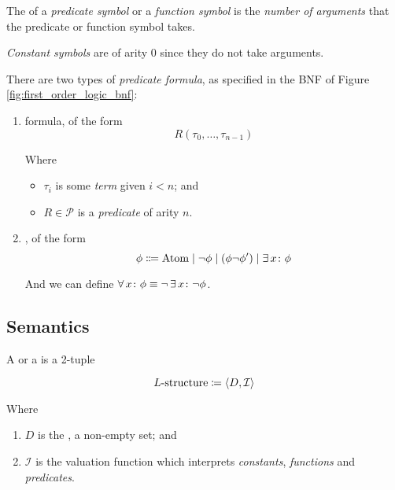 \begin{definition}[Arity]
    The  of a \textit{predicate symbol} or a \textit{function symbol} is the
    \textit{number of arguments} that the predicate or function symbol takes.
    
    \textit{Constant symbols} are of arity $0$ since they do not take arguments.
\end{definition}

\begin{definition}
    There are two types of \textit{predicate formula}, as specified in the BNF of Figure 
    \ref{fig:first_order_logic_bnf}:
    
    \begin{enumerate}
        \item {} formula, of the form
            \begin{equation}
                R(\tau_0, \ldots, \tau_{n-1})
            \end{equation}
            
            Where
            \begin{itemize}
                \item $\tau_{i}$ is some \textit{term} given $i < n$; and
                \item $R \in \mathcal{P}$ is a \textit{predicate} of arity $n$.
            \end{itemize}
        \item {}, of the form
            \begin{equation}
                \phi \Coloneqq \mathrm{Atom} 
                    \mid \neg \phi 
                    \mid ( \phi \neg \phi' )
                    \mid \operatorname{\exists} x \colon \phi
            \end{equation}
            
            And we can define $\operatorname{\forall} x \colon \phi \equiv \neg \operatorname{\exists} x \colon \neg \phi$.
    \end{enumerate}
\end{definition}

\subsection{Semantics}

\begin{definition}[$L$-Structure]
    A  or a  is a 2-tuple
    
    \begin{equation}
        L\text{-structure} \coloneqq \langle {D, \mathcal{I}} \rangle
    \end{equation}
    
    Where
    \begin{enumerate}
        \item $D$ is the , a non-empty set; and
        \item $\mathcal{I}$ is the valuation function which interprets \textit{constants}, 
        \textit{functions} and \textit{predicates}.
    \end{enumerate}
\end{definition}

